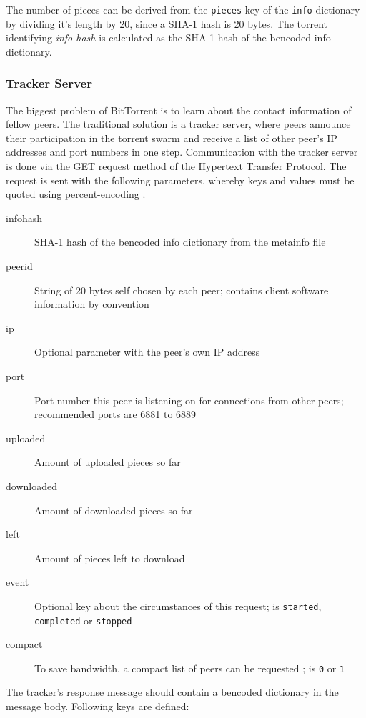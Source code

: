 \documentclass[10pt, a4paper, twoside]{scrartcl}
\renewcommand{\_}{\origunderscore\allowbreak}
\begin{document}
The number of pieces can be derived from the \texttt{pieces} key of the \texttt{info} dictionary by dividing it's length by 20, since a SHA-1 hash is 20 bytes. The torrent identifying \emph{info hash} is calculated as the SHA-1 hash of the bencoded info dictionary.

\subsubsection{Tracker Server}
The biggest problem of BitTorrent is to learn about the contact information of fellow peers. The traditional solution is a tracker server, where peers announce their participation in the torrent swarm and receive a list of other peer's IP addresses and port numbers in one step. Communication with the tracker server is done via the GET request method of the Hypertext Transfer Protocol. The request is sent with the following parameters, whereby keys and values must be quoted using percent-encoding \cite[§~2.1]{percent}.

\begin{description}
  \item[info\_hash] SHA-1 hash of the bencoded info dictionary from the metainfo file
  \item[peer\_id] String of 20 bytes self chosen by each peer; contains client software information by convention
  \item[ip] Optional parameter with the peer's own IP address
  \item[port] Port number this peer is listening on for connections from other peers; recommended ports are 6881 to 6889
  \item[uploaded] Amount of uploaded pieces so far
  \item[downloaded] Amount of downloaded pieces so far
  \item[left] Amount of pieces left to download
  \item[event] Optional key about the circumstances of this request; is \texttt{started}, \texttt{completed} or \texttt{stopped}
  \item[compact] To save bandwidth, a compact list of peers can be requested \cite{bep23}; is \texttt{0} or \texttt{1}
\end{description}

The tracker's response message should contain a bencoded dictionary in the message body. Following keys are defined:
\end{document}
